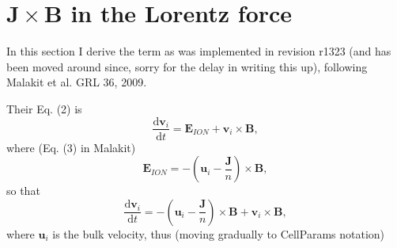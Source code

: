 \documentclass[a4paper,10pt]{article}
\newcommand{\vv}[1]{\mathbf{#1}}
\newcommand{\dif}{\mathrm{d}}
\newcommand{\pp}[1]{\left(#1\right)}
\begin{document}
\section{$\mathbf{J}\times\mathbf{B}$ in the Lorentz force}
In this section I derive the term as was implemented in revision r1323 (and has been moved around since, sorry for the delay in writing this up), following Malakit et al. GRL 36, 2009.

Their Eq. (2) is
\begin{equation}
   \frac{\dif\vv{v}_i}{\dif t} = \vv{E}_{ION} + \vv{v}_i\times\vv{B},
\end{equation}
where (Eq. (3) in Malakit)
\begin{equation}
   \vv{E}_{ION} = -\pp{\vv{u}_i-\frac{\vv{J}}{n}}\times\vv{B},
\end{equation}
so that
\begin{equation}
   \frac{\dif\vv{v}_i}{\dif t} = -\pp{\vv{u}_i - \frac{\vv{J}}{n}}\times\vv{B} + \vv{v}_i\times\vv{B},
\end{equation}
where $\vv{u}_i$ is the bulk velocity, thus (moving gradually to CellParams notation)
\end{document}
